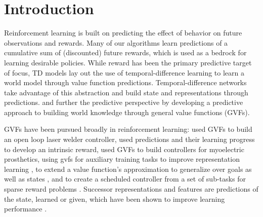 \documentclass[11pt]{article} %
\newcommand{\citeplease}{\textbf{[CITE]}}
\begin{document}
\section{Introduction}



Reinforcement learning is built on predicting the effect of behavior
on future observations and rewards. Many of our algorithms learn
predictions of a cumulative sum of (discounted) future rewards, which
is used as a bedrock for learning desirable policies. While reward has
been the primary predictive target of focus, TD models
\parencite{sutton1995td} lay out the use of temporal-difference
learning to learn a world model through value function
predictions. Temporal-difference networks
\parencite{sutton2004temporal} take advantage of this abstraction and
build state and representations through
predictions. \cite{sutton2011} and
\cite{white2015} further the predictive
perspective by developing a predictive approach to building world
knowledge through general value functions (GVFs).

GVFs have been pursued broadly in reinforcement learning: \cite{gunther2016intelligent} used GVFs to build an open loop laser welder controller, \cite{linke2020adapting} used predictions and their learning progress to develop an intrinsic reward, \cite{edwards2016application} used GVFs to build controllers for myoelectric prosthetics, using gvfs for auxiliary training tasks to improve representation learning \parencite{jaderberg2017,veeriah2019discovery}, to extend a value function's approximation to generalize over goals as well as states \parencite{schaul2015universal}, and to create a scheduled controller from a set of sub-tasks for sparse reward problems \parencite{riedmiller2018learning}. Successor
representations and features are predictions of the state, learned or
given, which have been shown to improve learning performance
\parencite{dayan1993, russek2017, barreto2018, sherstan2018}.
\end{document}
